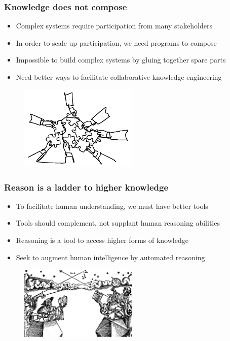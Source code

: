 \documentclass{beamer}
\begin{document}
\begin{frame}
  \frametitle{Knowledge does not compose}
  \begin{itemize}
    \item Complex systems require participation from many stakeholders
    \item In order to scale up participation, we need programs to compose
    \item Impossible to build complex systems by gluing together spare parts
    \item Need better ways to facilitate collaborative knowledge engineering
  \end{itemize}
  \begin{figure}[H]
    \centering
    \includegraphics[width=0.5\textwidth]{../../clipart/compositionality.jpeg}
  \end{figure}
\end{frame}

\begin{frame}
  \frametitle{Reason is a ladder to higher knowledge}
  \begin{itemize}
    \item To facilitate human understanding, we must have better tools
    \item Tools should complement, not supplant human reasoning abilities
    \item Reasoning is a tool to access higher forms of knowledge
    \item Seek to augment human intelligence by automated reasoning
  \end{itemize}
  \begin{figure}[H]
    \centering
    \includegraphics[width=0.5\textwidth]{../../clipart/astronomers.png}
  \end{figure}
\end{frame}
\end{document}
